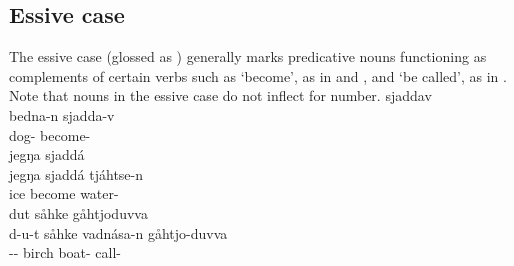 \subsection{Essive case}\label{essive}
The essive case (glossed as \ESSs) generally marks predicative nouns functioning as complements of certain verbs such as  ‘become’, as in  and , and  ‘be called’, as in . Note that nouns in the essive case do not inflect for number. 
\ea\label{ess1a}
\glll	{} sjaddav\\
	bedna-n sjadda-v\\
	dog- become-\\\nopagebreak
{} 
\z
\ea\label{ess1b}
\glll	jegŋa sjaddá \\
	jegŋa sjaddá tjáhtse-n\\
	ice\BS{} become\BS{} water-\\\nopagebreak
{} 
\z
%
\ea\label{ess2}
\glll	dut såhke  gåhtjoduvva\\
	d-u-t såhke vadnása-n gåhtjo-duvva \\
	-- birch\BS{} boat- call-\\\nopagebreak
{} 
\z%

